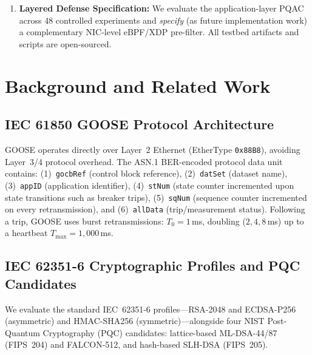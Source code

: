 \documentclass[journal]{IEEEtran}
\begin{document}
\begin{enumerate}[leftmargin=*,noitemsep,topsep=1pt]
    \item \textbf{Layered Defense Specification:} We evaluate the application-layer PQAC across 48 controlled experiments and \emph{specify} (as future implementation work) a complementary NIC-level eBPF/XDP pre-filter. All testbed artifacts and scripts are open-sourced.
\end{enumerate}

\section{Background and Related Work}
\label{sec:background}

\subsection{IEC 61850 GOOSE Protocol Architecture}
GOOSE operates directly over Layer~2 Ethernet (EtherType \texttt{0x88B8}), avoiding Layer~3/4 protocol overhead. The ASN.1 BER-encoded protocol data unit contains:
(1)~\texttt{gocbRef} (control block reference), (2)~\texttt{datSet} (dataset name), (3)~\texttt{appID} (application identifier), (4)~\texttt{stNum} (state counter incremented upon state transitions such as breaker trips), (5)~\texttt{sqNum} (sequence counter incremented on every retransmission), and (6)~\texttt{allData} (trip/measurement status).
Following a trip, GOOSE uses burst retransmissions: $T_0 = 1$\,ms, doubling ($2, 4, 8$\,ms) up to a heartbeat $T_{\max} = 1,000$\,ms.

\subsection{IEC 62351-6 Cryptographic Profiles and PQC Candidates}
We evaluate the standard IEC~62351-6 profiles---RSA-2048 and ECDSA-P256 (asymmetric) and HMAC-SHA256 (symmetric)---alongside four NIST Post-Quantum Cryptography (PQC) candidates: lattice-based ML-DSA-44/87 (FIPS~204) and FALCON-512, and hash-based SLH-DSA (FIPS~205).
\end{document}
